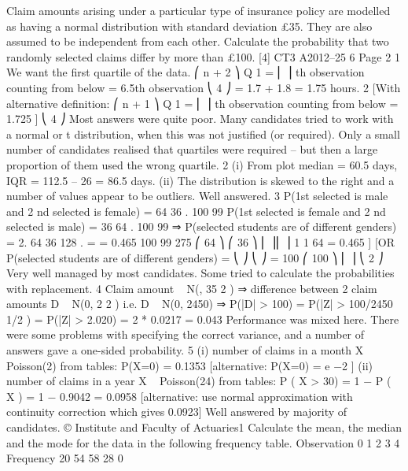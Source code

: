 \documentclass[a4paper,12pt]{article}
\begin{document}
\begin{enumerate}
Claim amounts arising under a particular type of insurance policy are modelled as
having a normal distribution with standard deviation £35. They are also assumed to be
independent from each other.
Calculate the probability that two randomly selected claims differ by more than £100.
[4]
CT3 A2012–25
6
Page 2%
1
We want the first quartile of the data.
⎛ n + 2 ⎞
Q 1 = ⎜
⎟ th observation counting from below = 6.5th observation
⎝ 4 ⎠
=
1.7 + 1.8
= 1.75 hours.
2
[With alternative definition:
⎛ n + 1 ⎞
Q 1 = ⎜
⎟ th observation counting from below = 1.725 ]
⎝ 4 ⎠
Most answers were quite poor. Many candidates tried to work with a normal or t distribution,
when this was not justified (or required). Only a small number of candidates realised that
quartiles were required – but then a large proportion of them used the wrong quartile.
2
(i) From plot median = 60.5 days, IQR = 112.5 – 26 = 86.5 days.
(ii) The distribution is skewed to the right and a number of values appear to be
outliers.
Well answered.
3
P(1st selected is male and 2 nd selected is female) = 64 36
.
100 99
P(1st selected is female and 2 nd selected is male) = 36 64
.
100 99
⇒ P(selected students are of different genders) = 2.
64 36 128
. =
= 0.465
100 99 275
⎛ 64 ⎞ ⎛ 36 ⎞
⎜ ⎟⎜ ⎟
1
1
64  
= 0.465 ]
[OR P(selected students are of different genders) = ⎝ ⎠ ⎝ ⎠ =
100 
⎛ 100 ⎞
⎜
⎟
⎝ 2 ⎠
Very well managed by most candidates. Some tried to calculate the probabilities with
replacement.
4
Claim amount ~ N(\mu, 35 2 ) ⇒ difference between 2 claim amounts D ~ N(0, 2 2 )
i.e. D ~ N(0, 2450)
⇒ P(|D| > 100) = P(|Z| > 100/2450 1/2 ) = P(|Z| > 2.020) = 2 * 0.0217 = 0.043
Performance was mixed here. There were some problems with specifying the correct
variance, and a number of answers gave a one-sided probability.
5
(i)
number of claims in a month X ~ Poisson(2)
from tables: P(X=0) = 0.1353
[alternative: P(X=0) = e −2 ]
(ii)
number of claims in a year X ~ Poisson(24)
from tables: P ( X > 30) = 1 − P ( X ) = 1 − 0.9042 = 0.0958
[alternative: use normal approximation with continuity correction which
gives 0.0923]
Well answered by majority of candidates.
© Institute and Faculty of Actuaries1
Calculate the mean, the median and the mode for the data in the following frequency
table.
Observation 0 1 2 3 4
Frequency 20 54 58 28 0


\end{enumerate}
\end{document}
